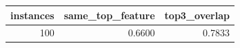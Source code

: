 \begin{tabular}{rrr}
\toprule
instances & same_top_feature & top3_overlap \\
\midrule
100 & 0.6600 & 0.7833 \\
\bottomrule
\end{tabular}
